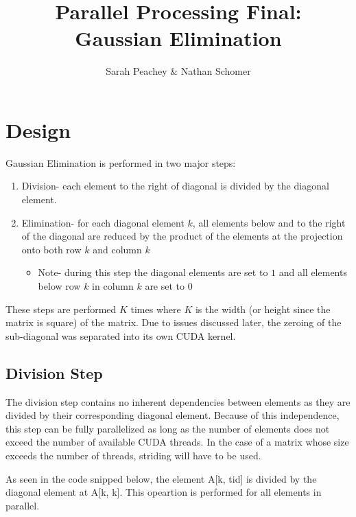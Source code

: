 \documentclass[12pt]{article}
\begin{document}
\title{Parallel Processing Final: \\Gaussian Elimination}
\author{Sarah Peachey \& Nathan Schomer}
\maketitle


\section{Design}

Gaussian Elimination is performed in two major steps:

\begin{enumerate}
    \item{Division- each element to the right of diagonal is divided 
        by the diagonal element.}
    \item{Elimination- for each diagonal element $k$, all elements below
        and to the right of the diagonal are reduced by the product
    of the elements at the projection onto both row $k$ and column $k$}
    \begin{itemize}
        \item{Note- during this step the diagonal elements are set to $1$
            and all elements below row $k$ in column $k$ are set to $0$}
    \end{itemize}
\end{enumerate}

These steps are performed $K$ times where $K$ is the width
(or height since the matrix is square) of the matrix. 
Due to issues discussed later, the zeroing of the sub-diagonal
was separated into its own CUDA kernel.

\pagebreak
\subsection{Division Step}

The division step contains no inherent dependencies between 
elements as they are divided by their corresponding diagonal
element. Because of this independence, this step can be fully
parallelized as long as the number of elements does not exceed
the number of available CUDA threads. In the case of a matrix
whose size exceeds the number of threads, striding will have to 
be used.

As seen in the code snipped below, the element A[k, tid] is 
divided by the diagonal element at A[k, k]. This opeartion
is performed for all elements in parallel.
\end{document}
